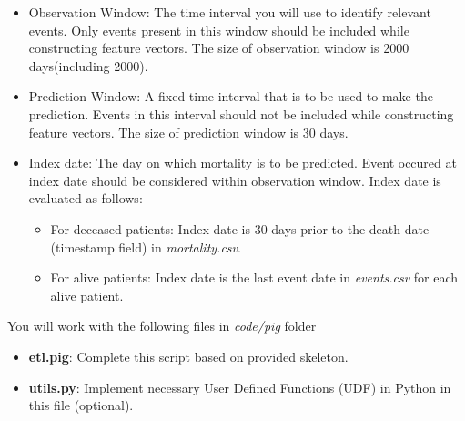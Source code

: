 \documentclass[12pt]{article}
\begin{document}
\begin{itemize}
\item Observation Window: The time interval you will use to identify relevant events. Only events present in this window should be included while constructing  feature vectors. The size of observation window is 2000 days(including 2000). 
\item Prediction Window: A fixed time interval that is to be used to make the prediction. Events in this interval should not be included while constructing feature vectors. The size of prediction window is 30 days. 
\item Index date: The day on which mortality is to be predicted. Event occured at index date should be considered within observation window. Index date is evaluated as follows:
\begin{itemize}
\item For deceased patients: Index date is 30 days prior to the death date (timestamp field) in \textit{mortality.csv}. 
\item For alive patients: Index date is the last event date in \textit{events.csv} for each alive patient. 
\end{itemize}
\end{itemize}

You will work with the following files in \textit{code/pig} folder
\begin{itemize}
\item \textbf{etl.pig}: Complete this script based on provided skeleton. 
\item \textbf{utils.py}: Implement necessary User Defined Functions (UDF) in Python in this file (optional).
\end{itemize}
\end{document}
